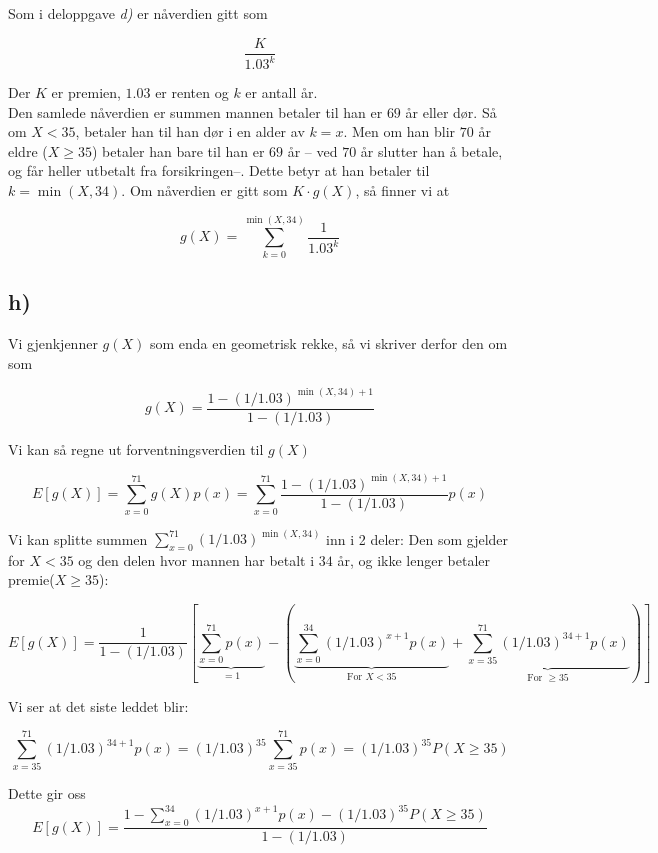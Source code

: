 \documentclass[a4paper,norsk, 10pt]{article}
\begin{document}
Som i deloppgave \textit{d)} er nåverdien gitt som 

$$
\frac{K}{1.03^k}
$$

Der $K$ er premien, $1.03$ er renten og $k$ er antall år. \\

Den samlede nåverdien er summen mannen betaler til han er $69$ år eller dør. Så om $X<35$, betaler han til han dør i en alder av $k = x$. Men om han blir $70$ år eldre ($X\geq 35$) betaler han bare til han er $69$ år -- ved $70$ år slutter han å betale, og får heller utbetalt fra forsikringen--. Dette betyr at han betaler til $k = \min(X,34)$. Om nåverdien er gitt som $K\cdot g(X)$, så finner vi at

\begin{equation}
g(X) = \sum_{k = 0}^{\min(X,34)}\frac{1}{1.03^k}
\end{equation}

\subsection*{h)}

Vi gjenkjenner $g(X)$ som enda en geometrisk rekke, så vi skriver derfor den om som

$$
g(X) = \frac{1-(1/1.03)^{\min(X,34)+1}}{1-(1/1.03)}
$$

Vi kan så regne ut forventningsverdien til $g(X)$

$$
E[g(X)] = \sum_{x = 0}^{71}g(X)p(x) = \sum_{x = 0}^{71}\frac{1-(1/1.03)^{\min(X,34)+1}}{1-(1/1.03)} p(x)
$$

Vi kan splitte summen $\sum_{x = 0}^{71}(1/1.03)^{\min(X,34)}$ inn i 2 deler: Den som gjelder for $X<35$ og den delen hvor mannen har betalt i $34$ år, og ikke lenger betaler premie($X \geq 35$):

$$
E[g(X)] = \frac{1}{1-(1/1.03)}\left[\underbrace{\sum_{x = 0}^{71} p(x)}_{= 1} - \left(\underbrace{\sum_{x = 0}^{34}(1/1.03)^{x+1}p(x)}_{\text{For }X<35} + \underbrace{\sum_{x = 35}^{71} (1/1.03)^{34 + 1}p(x)}_{\text{For } \geq 35}\right)\right] 
$$

Vi ser at det siste leddet blir:

$$
\sum_{x = 35}^{71} (1/1.03)^{34 + 1}p(x) = (1/1.03)^{35}\sum_{x = 35}^{71} p(x) = (1/1.03)^{35}P(X\geq 35)
$$

Dette gir oss
\begin{equation}
E[g(X)] = \frac{1 - \sum_{x = 0}^{34}(1/1.03)^{x+1}p(x) - (1/1.03)^{35}P(X\geq 35)}{1-(1/1.03)}
\end{equation}
\end{document}
